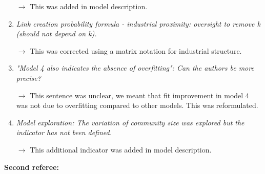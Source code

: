 \documentclass[10pt,a4paper,sans]{moderncv}
\begin{document}
\begin{enumerate}
	$\rightarrow$ This was added in model description.
	
	\medskip

	\item \textit{Link creation probability formula - industrial proximity: oversight to remove k (should not depend on k).}
	
	$\rightarrow$ This was corrected using a matrix notation for industrial structure.
	
	\medskip

	\item \textit{"Model 4 also indicates the absence of overfitting": Can the authors be more precise?}

	$\rightarrow$ This sentence was unclear, we meant that fit improvement in model 4 was not due to overfitting compared to other models. This was reformulated.
	
	\medskip

	\item \textit{Model exploration: The variation of community size was explored but the indicator has not been defined.}
	
	$\rightarrow$ This additional indicator was added in model description.

\end{enumerate}


\bigskip
\bigskip


\textbf{Second referee:}

\medskip

\end{document}
